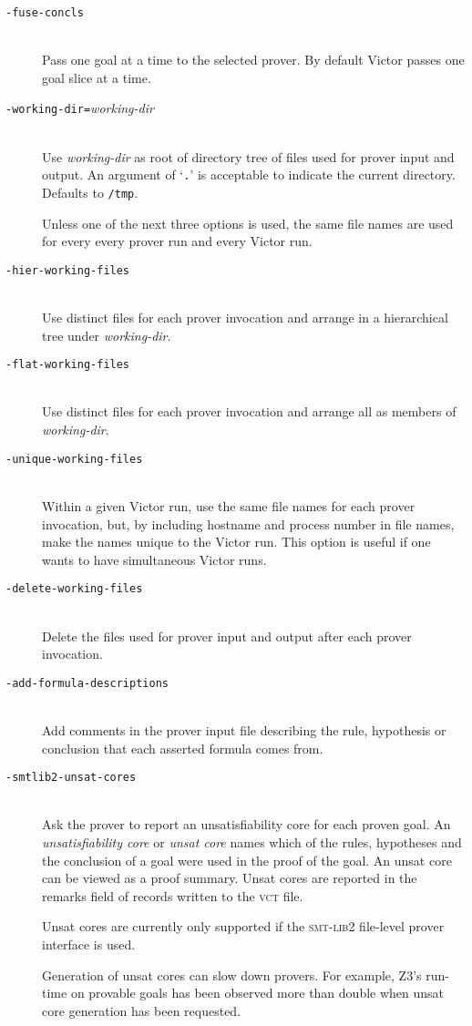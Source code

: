 \documentclass[12pt,fleqn]{article}
\newcommand{\zthree}{\textsc{Z}3}
\newcommand{\smtlib}{\textsc{smt-lib}}
\newcommand{\goalreportfile}{\textsc{vct}}
\newcommand{\optionb}[1]{\item[\texttt{-{#1}}]\ \\}
\newcommand{\optionv}[2]{\item[\texttt{-{#1}=}\mdseries\textit{#2}]\ \\}
\begin{document}
\begin{description}
\optionb{fuse-concls} 
  Pass one goal at a time to the selected prover.  By default Victor
  passes one goal slice at a time.

\optionv{working-dir}{working-dir} 
  Use \textit{working-dir} as root of directory tree of files used for prover
  input and output.   An argument of  `\texttt{.}' is acceptable to indicate
  the current directory.  Defaults to \texttt{/tmp}.  

  Unless one of the next three options is used, the same file
  names are used for every every prover run and every Victor run.

\optionb{hier-working-files}
   Use distinct files for each prover invocation and arrange in a
   hierarchical tree under \emph{working-dir}.

\optionb{flat-working-files}
   Use distinct files for each prover invocation and arrange all as 
   members of \emph{working-dir}.


\optionb{unique-working-files}
  Within a given Victor run, use the same file names for each prover
  invocation, but, by including hostname and process
  number in file names, make the names unique to the Victor run.
  This option is useful if one wants to have simultaneous Victor runs.

\optionb{delete-working-files}
  Delete the files used for prover input and output after
  each prover invocation.

\optionb{add-formula-descriptions} 
  Add comments in the prover input file describing the rule, hypothesis
  or conclusion that each asserted formula comes from.

\optionb{smtlib2-unsat-cores}
  Ask the prover to report an unsatisfiability core for each proven goal.
  An \emph{unsatisfiability core} or \emph{unsat core} names which of
  the rules, hypotheses and the conclusion of a goal were used in the
  proof of the goal.  An unsat core can be viewed as a proof summary.
  Unsat cores are reported in the remarks field of records written to the
  \goalreportfile{} file.

  Unsat cores are currently only supported if the \smtlib{}2 file-level
  prover interface is used.

  Generation of unsat cores can slow down provers.  For example,
  \zthree's run-time on provable goals has been observed more than
  double when unsat core generation has been requested.


\end{description}
\end{document}
